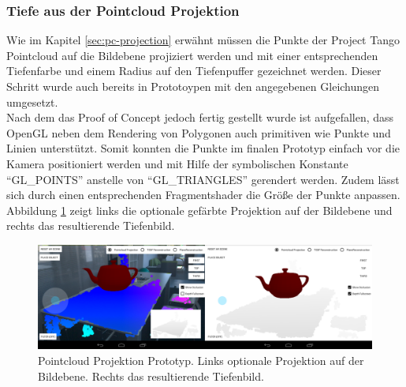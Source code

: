 \subsubsection*{Tiefe aus der Pointcloud Projektion}

Wie im Kapitel \ref{sec:pc-projection} erwähnt müssen die Punkte der Project Tango Pointcloud auf die Bildebene projiziert werden und mit einer entsprechenden Tiefenfarbe und einem Radius auf den Tiefenpuffer gezeichnet werden. Dieser Schritt wurde auch bereits in Prototoypen mit den angegebenen Gleichungen umgesetzt. \\

Nach dem das Proof of Concept jedoch fertig gestellt wurde ist aufgefallen, dass OpenGL neben dem Rendering von Polygonen auch primitiven wie Punkte und Linien unterstützt. Somit konnten die Punkte im finalen Prototyp einfach vor die Kamera positioniert werden und mit Hilfe der symbolischen Konstante \enquote{GL\_POINTS} anstelle von \enquote{GL\_TRIANGLES} gerendert werden. Zudem lässt sich durch einen entsprechenden Fragmentshader die Größe der Punkte anpassen. Abbildung \ref{fig:pc-demo} zeigt links die optionale gefärbte Projektion auf der Bildebene und rechts das resultierende Tiefenbild.

\begin{figure}[h]
  \centering
	\includegraphics[width=1.0\textwidth]{content/images/implementation/pc-demo.png} 
  \caption{Pointcloud Projektion Prototyp. Links optionale Projektion auf der Bildebene. Rechts das resultierende Tiefenbild.}
  \label{fig:pc-demo}
\end{figure}




